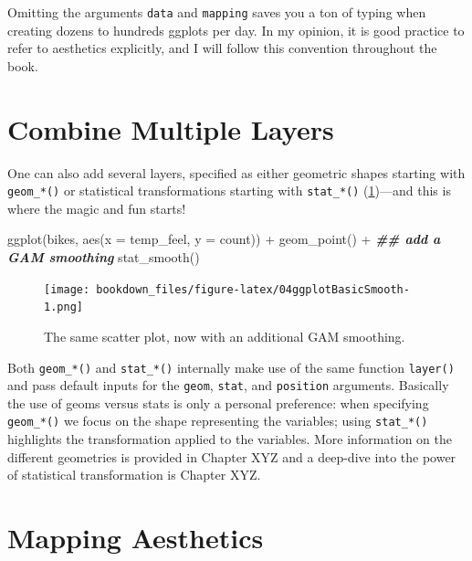 \documentclass[
]{krantz}
\makeatletter
\newenvironment{Shaded}{\begin{snugshade}}{\end{snugshade}}
\newcommand{\AttributeTok}[1]{\textcolor[rgb]{0.61,0.61,0.61}{#1}}
\newcommand{\DocumentationTok}[1]{\textcolor[rgb]{0.37,0.37,0.37}{\textbf{\textit{#1}}}}
\newcommand{\FunctionTok}[1]{\textcolor[rgb]{0,0,0}{#1}}
\newcommand{\NormalTok}[1]{#1}
\newcommand{\SpecialCharTok}[1]{\textcolor[rgb]{0,0,0}{#1}}
\newenvironment{kframe}{%
\medskip{}
\setlength{\fboxsep}{.8em}
 \def\at@end@of@kframe{}%
 \ifinner\ifhmode%
  \def\at@end@of@kframe{\end{minipage}}%
  \begin{minipage}{\columnwidth}%
 \fi\fi%
 \def\FrameCommand##1{\hskip\@totalleftmargin \hskip-\fboxsep
 \colorbox{shadecolor}{##1}\hskip-\fboxsep
     \hskip-\linewidth \hskip-\@totalleftmargin \hskip\columnwidth}%
 \MakeFramed {\advance\hsize-\width
   \@totalleftmargin\z@ \linewidth\hsize
   \@setminipage}}%
 {\par\unskip\endMakeFramed%
 \at@end@of@kframe}
\renewenvironment{Shaded}{\begin{kframe}}{\end{kframe}}
\makeatother
\begin{document}
Omitting the arguments \texttt{data} and \texttt{mapping} saves you a ton of typing when creating dozens to hundreds ggplots per day. In my opinion, it is good practice to refer to aesthetics explicitly, and I will follow this convention throughout the book.

\hypertarget{combined-layers}{%
\section{Combine Multiple Layers}\label{combined-layers}}

One can also add several layers, specified as either geometric shapes starting with \texttt{geom\_*()} or statistical transformations starting with \texttt{stat\_*()} (\ref{fig:04ggplotBasicSmooth})---and this is where the magic and fun starts!

\begin{Shaded}
\begin{Highlighting}[]
\FunctionTok{ggplot}\NormalTok{(bikes, }\FunctionTok{aes}\NormalTok{(}\AttributeTok{x =}\NormalTok{ temp\_feel, }\AttributeTok{y =}\NormalTok{ count)) }\SpecialCharTok{+} 
  \FunctionTok{geom\_point}\NormalTok{() }\SpecialCharTok{+} 
  \DocumentationTok{\#\# add a GAM smoothing}
  \FunctionTok{stat\_smooth}\NormalTok{()}
\end{Highlighting}
\end{Shaded}

\begin{figure}
\centering
\texttt{[image: bookdown\_files/figure-latex/04ggplotBasicSmooth-1.png]}
\caption{\label{fig:04ggplotBasicSmooth}The same scatter plot, now with an additional GAM smoothing.}
\end{figure}

Both \texttt{geom\_*()} and \texttt{stat\_*()} internally make use of the same function \texttt{layer()} and pass default inputs for the \texttt{geom}, \texttt{stat}, and \texttt{position} arguments. Basically the use of geoms versus stats is only a personal preference: when specifying \texttt{geom\_*()} we focus on the shape representing the variables; using \texttt{stat\_*()} highlights the transformation applied to the variables. More information on the different geometries is provided in Chapter XYZ and a deep-dive into the power of statistical transformation is Chapter XYZ.

\hypertarget{map-aesthetics}{%
\section{Mapping Aesthetics}\label{map-aesthetics}}
\end{document}
